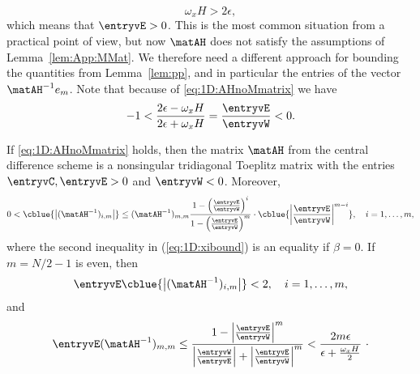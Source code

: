 %
\begin{equation}\label{eq:1D:AHnoMmatrix}
\omega_x H >  2\epsilon,
\end{equation}
%
which means that $\entryvE>0$. This is the most common situation from a
practical point of view, but now $\matAH$ does not satisfy the assumptions of
Lemma~\ref{lem:App:MMat}. We therefore need a different approach for bounding
the quantities from Lemma~\ref{lem:pp}, and in particular the entries of the
vector $\matAH^{-1} e_m$. Note that because of \eqref{eq:1D:AHnoMmatrix}
we have
%
$$ -1 < \frac{2\epsilon-\omega_x H}{2\epsilon+\omega_x H}=
\frac{\entryvE}{\entryvW}<0.$$


\begin{lemma}\label{lem:1D:usmani}
If \eqref{eq:1D:AHnoMmatrix} holds, then the matrix $\matAH$ from the central
difference scheme is a nonsingular tridiagonal Toeplitz matrix with the
entries $\entryvC,\entryvE>0$ and $\entryvW<0$. Moreover,
%
\begin{equation}\label{eq:1D:xibound}
0< \cblue{\left|(\matAH^{-1})_{i,m}\right|}\leq (\matAH^{-1})_{m,m}
\frac{1-\left(\frac{\entryvE}{\entryvW}\right)^{i}}{1-\left(\frac{\entryvE}{\entryvW}\right)^{m}}\cdot\cblue{\left|\frac{\entryvE}{\entryvW}\right|^{m-i}},
\quad i=1,\dots, m,
\end{equation}
%
where the second inequality in {\rm (\ref{eq:1D:xibound})} is an equality if
$\beta=0$.
%
If $m=N/2-1$ is even, then
%
\begin{equation}\label{eq:1D:bdtwo}
\entryvE \cblue{\left|(\matAH^{-1})_{i,m}\right|} < 2,\quad i=1,\dots,m,
\end{equation}
%
and
%
\begin{equation}\label{eq:1D:xim}
\entryvE (\matAH^{-1})_{m,m} \leq\frac{1-\left|\frac{\entryvE}{\entryvW}\right|^{m}}{\left|\frac{\entryvW}{\entryvE}\right|+\left|\frac{\entryvE}{\entryvW}\right|^{m}}
<	\frac{2m\epsilon}{\epsilon+\frac{\omega_x H}{2}} ~\cdot
\end{equation}
%
\end{lemma}

